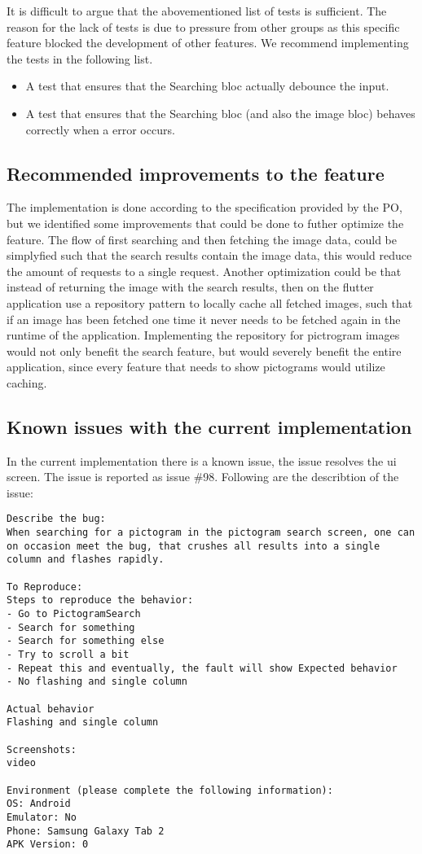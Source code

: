 It is difficult to argue that the abovementioned list of tests is sufficient. The reason for the lack of tests is due to pressure from other groups as this specific feature blocked the development of other features. We recommend implementing the tests in the following list. 

\begin{itemize}
  \item A test that ensures that the Searching \gls{bloc} actually debounce the input.
  \item A test that ensures that the Searching \gls{bloc} (and also the image \gls{bloc}) behaves correctly when a error occurs.
\end{itemize}

\subsection{Recommended improvements to the feature}
The implementation is done according to the specification provided by the \gls{PO}, but we identified some improvements that could be done to futher optimize the feature. The flow of first searching and then fetching the image data, could be simplyfied such that the search results contain the image data, this would reduce the amount of requests to a single request. Another optimization could be that instead of returning the image with the search results, then on the flutter application use a repository pattern to locally cache all fetched images, such that if an image has been fetched one time it never needs to be fetched again in the runtime of the application. Implementing the repository for pictrogram images would not only benefit the search feature, but would severely benefit the entire application, since every feature that needs to show pictograms would utilize caching.

\subsection{Known issues with the current implementation}
In the current implementation there is a known issue, the issue resolves the \gls{ui} screen. The issue is reported as issue \#98. Following are the describtion of the issue:
\begin{lstlisting}
Describe the bug:
When searching for a pictogram in the pictogram search screen, one can on occasion meet the bug, that crushes all results into a single column and flashes rapidly.

To Reproduce:
Steps to reproduce the behavior:
- Go to PictogramSearch
- Search for something
- Search for something else
- Try to scroll a bit
- Repeat this and eventually, the fault will show Expected behavior
- No flashing and single column

Actual behavior
Flashing and single column

Screenshots:
video

Environment (please complete the following information):
OS: Android
Emulator: No
Phone: Samsung Galaxy Tab 2
APK Version: 0
\end{lstlisting}
